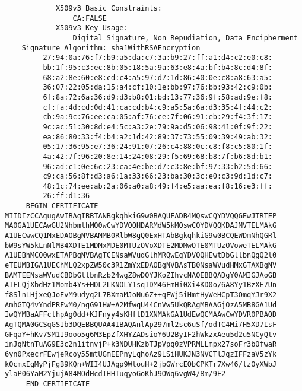 \documentclass[11pt,a4paper]{article}
\begin{document}
\begin{verbatim}
            X509v3 Basic Constraints: 
                CA:FALSE
            X509v3 Key Usage: 
                Digital Signature, Non Repudiation, Data Encipherment
    Signature Algorithm: sha1WithRSAEncryption
         27:94:0a:76:f7:b9:a5:da:c7:3a:b9:27:ff:a1:d4:c2:e0:c8:
         bb:1f:95:c3:ec:8b:05:18:5a:9a:63:e8:4a:bf:b4:8c:d4:8f:
         68:a2:8e:60:e8:cd:c4:a5:97:d7:1d:86:40:0e:c8:a8:63:a5:
         36:07:22:05:da:15:a4:cf:10:1e:bb:97:76:bb:93:42:c9:0b:
         6f:8a:72:6a:36:d9:d3:b8:01:bd:13:77:36:9f:58:ad:9e:f8:
         cf:fa:4d:cd:0d:41:ca:cd:b4:c9:a5:5a:6a:d3:35:4f:44:c2:
         cb:9a:9c:76:ee:ca:05:af:76:ce:7f:06:91:eb:29:f4:3f:17:
         9c:ac:51:30:8d:e4:5c:a3:2e:79:9a:d5:06:98:41:0f:9f:22:
         ea:86:80:33:f4:b4:a2:1d:42:89:37:73:55:09:39:49:ab:32:
         05:17:36:95:e7:36:24:91:07:26:c4:88:0c:c8:f8:c5:80:1f:
         4a:42:7f:96:20:8e:14:24:08:29:f5:69:68:b8:7f:b6:8d:b1:
         96:ad:c1:0e:6c:23:ca:4e:be:d7:c3:8e:bf:97:33:b2:5d:66:
         c9:ca:56:8f:d3:a6:1a:33:66:23:ba:30:3c:e0:c3:9d:1d:c7:
         48:1c:74:ee:ab:2a:06:a0:a8:49:f4:e5:aa:ea:f8:16:e3:ff:
         26:ff:d1:36
-----BEGIN CERTIFICATE-----
MIIDIzCCAgugAwIBAgIBBTANBgkqhkiG9w0BAQUFADB4MQswCQYDVQQGEwJTRTEP
MA0GA1UECAwGU2NhbmlhMQ0wCwYDVQQHDARMdW5kMQswCQYDVQQKDAJMVTELMAkG
A1UECwwCQ1MxEDAOBgNVBAMMB0RlbW8gQ0ExHTAbBgkqhkiG9w0BCQEWDmNhQGRl
bW9sYW5kLnNlMB4XDTE1MDMxMDE0MTUzOVoXDTE2MDMwOTE0MTUzOVoweTELMAkG
A1UEBhMCQ0wxETAPBgNVBAgTCENsaWVudGlhMRQwEgYDVQQHEwtDbGllbnQgQ2l0
eTEUMBIGA1UEChMLQ2xpZW50c3R1ZmYxEDAOBgNVBAsTB0NsaWVudHMxGTAXBgNV
BAMTEENsaWVudCBDbGllbnRzb24wgZ8wDQYJKoZIhvcNAQEBBQADgY0AMIGJAoGB
AIFLQjXbdHz1Momb4Ys+HDL2LKNOLY1sqIDM46FmHi0Xi4KD0o/6A8Yy1BzXE7Un
f8SlnLHjxeQJoEvM9udyq2L7BXmaMJoNu6Z++qFWj5iHmtHyWeHCpT3OmqYJr9X2
AmhGTQ4vYndPRFwM0/ngG91HW+A2MfwqU44CnVw5UkQRAgMBAAGjOzA5MB8GA1Ud
IwQYMBaAFFclhpAg0dd+KJFnyy4sKHftD1XNMAkGA1UdEwQCMAAwCwYDVR0PBAQD
AgTQMA0GCSqGSIb3DQEBBQUAA4IBAQAnlAp297ml2sc6uSf/odTC4Mi7H5XD7IsF
GFqaY+hKv7SM1I9ooo5g6M3EpZfXHYZADsioY6U2ByIF2hWkzxAeu5d2u5NCyQtv
inJqNtnTuAG9E3c2n1itnvjP+k3NDUHKzbTJpVpq0zVPRMLLmpx27soFr3bOfwaR
6yn0PxecrFEwjeRcoy55mtUGmEEPnyLqhoAz9LSiHUKJN3NVCTlJqzIFFzaV5zYk
kQcmxIgMyPjFgB9KQn+WII4UJAgp9WlouH+2jbGWrcEObCPKTr7Xw46/lzOyXWbJ
ylaP06YaM2YjujA84MOdHcdIHHTuqyoGoKhJ9OWq6vgW4/8m/9E2
-----END CERTIFICATE-----
\end{verbatim}

\newpage
\end{document}
